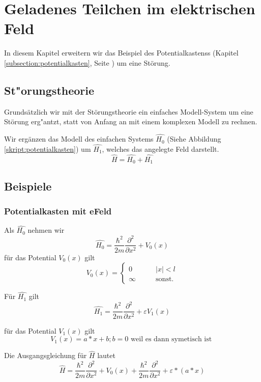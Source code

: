 \chapter{Geladenes Teilchen im elektrischen Feld\label{chapter:efeld}}
\begin{refsection}


In diesem Kapitel erweitern wir das Beispiel des Potentialkastenss 
(Kapitel \ref{subsection:potentialkasten}, Seite \pageref{subsection:potentialkasten})
um eine St\"orung.

\section{ St"orungstheorie }
Grundsätzlich wir mit der St\"orungstheorie ein einfaches Modell-System um eine St\"orung
erg"antzt, statt von Anfang an mit einem komplexen Modell zu rechnen.

Wir erg\"anzen das Modell des einfachen Systems $\hat{H_0}$
(Siehe Abbildung \ref{skript:potentialkasten})
um $\hat{H_1}$, welches das angelegte Feld darstellt.
\[
\hat{H} = \hat{H_0} + \hat{H_1}
\]





\section{ Beispiele }

\subsection{ Potentialkasten mit eFeld }
Als $\hat{H_0}$ nehmen wir
\[
  \hat{H_0} = \frac{\hbar^2}{2m} \frac{\partial^2}{\partial x^2} + V_0(x)
\]
f\"ur das Potential $V_0(x)$ gilt
\[
  V_0(x)=\begin{cases}
    0       & \qquad |x|<l\\
    \infty  & \qquad\text{sonst.}
  \end{cases}
\]

F\"ur $\hat{H_1}$ gilt
\[
  \hat{H_1} = \frac{\hbar^2}{2m} \frac{\partial^2}{\partial x^2} + \varepsilon V_1(x)
\]

f\"ur das Potential $V_1(x)$ gilt
\[
  V_1(x) = a*x +b ; b = 0 \text{ weil es dann symetisch ist }
\]

Die Ausgangsgleichung f\"ur $\hat{H}$ lautet
\[
  \hat{H} = \frac{\hbar^2}{2m} \frac{\partial^2}{\partial x^2} + V_0(x) 
            + \frac{\hbar^2}{2m} \frac{\partial^2}{\partial x^2} + \varepsilon * (a*x)
\]



\end{refsection}
